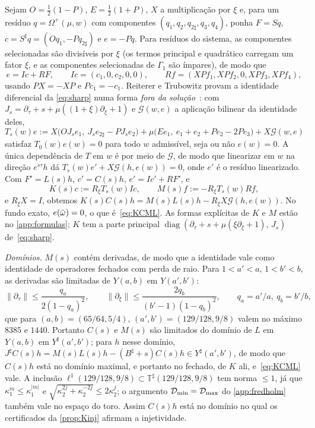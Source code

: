 Sejam $O=\tfrac12(1-P)$, $E=\tfrac12(1+P)$, $X$ a multiplicação por $\xi$ e, para um resíduo $q=\Omega^+(\mu,w)$ com
componentes $(q_1,q_2,q_{2\sharp},q_3,q_4)$, ponha $F=Sq$, $c=S^\sharp q=(Oq_1,-Pq_{2\sharp})$ e $e=-Pq$. Para resíduos
do sistema, as componentes selecionadas são divisíveis por $\xi$ (os termos principal e quadrático carregam um fator
$\xi$, e as componentes selecionadas de $\Gamma_1$ são ímpares), de modo que
\[
  e=Ic+RF,\qquad Ic=(c_1,0,c_2,0,0),\qquad Rf=(XPf_1,XPf_2,0,XPf_3,XPf_4),
\]
usando $PX=-XP$ e $Pc_1=-c_1$. Reiterer e Trubowitz provam a identidade diferencial da \cref{eq:sharp} numa forma
\emph{fora da solução}~\cite[\S2]{RT2019}: com $J_s=\partial_\tau+s+\mu((1+\xi)\partial_\xi+1)$ e $\mathcal G(w,e)$
a aplicação bilinear da identidade deles,
\[
  T_s(w)e:=X\big(OJ_se_1,\ J_se_{2\sharp}-PJ_se_2\big)+\mu\big(Ee_1,\ e_1+e_2+Pe_2-2Pe_3\big)+X\mathcal G(w,e)
\]
satisfaz $T_0(w)e(w)=0$ para todo $w$ admissível, seja ou não $e(w)=0$. A única dependência de $T$ em $w$ é
por meio de $\mathcal G$, de modo que linearizar em $w$ na direção $e^{s\tau}h$ dá $T_s(w)e'+X\mathcal G(h,e(w))=0$,
onde $e'$ é o resíduo linearizado. Com $F'=L(s)h$, $c'=C(s)h$, $e'=Ic'+RF'$, e
\[
  K(s)c:=R_\xi T_s(w)Ic,\qquad M(s)f:=-R_\xi T_s(w)Rf,
\]
e $R_\xi X=I$, obtemos $K(s)C(s)h=M(s)L(s)h-R_\xi X\mathcal G(h,e(w))$. No fundo exato, $e(\bar\omega)=0$,
o que é~\eqref{eq:KCML}. As formas explícitas de $K$ e $M$ estão no \cref{app:formulas}; $K$ tem a parte principal
$\operatorname{diag}(\partial_\tau+s+\mu(\xi\partial_\xi+1),\,J_s)$ de~\eqref{eq:sharp}.

\emph{Domínios.} $M(s)$ contém derivadas, de modo que a identidade vale como identidade de operadores fechados com perda de
raio. Para $1<a'<a$, $1<b'<b$, as derivadas são limitadas de $Y(a,b)$ em $Y(a',b')$:
\[
  \|\partial_\tau\|\le\frac{q_a}{2(1-q_a)^2},\qquad \|\partial_\xi\|\le\frac{2q_b}{(b'-1)(1-q_b)^2},\qquad
  q_a=a'/a,\ q_b=b'/b,
\]
que para $(a,b)=(65/64,5/4)$, $(a',b')=(129/128,9/8)$ valem no máximo $8385$ e $1440$. Portanto $C(s)$ e $M(s)$ são limitados
do domínio de $L$ em $Y(a,b)$ em $Y^\sharp(a',b')$; para $h$ nesse domínio,
$J^\sharp C(s)h=M(s)L(s)h-(B^\sharp+s)C(s)h\in Y^\sharp(a',b')$, de modo que $C(s)h$ está no domínio maximal, e portanto no fechado,
de $K$ ali, e~\eqref{eq:KCML} vale. A inclusão $\ell^1(129/128,9/8)\subset\mathbb T^\sharp(129/128,9/8)$ tem norma
$\le1$, já que $\kappa_1^m\le\kappa_1^{|m|}$ e $\sqrt{\kappa_2^{2j}+\kappa_2^{-2j}}\le2\kappa_2^j$; o argumento $\mathcal{D}_{\min}=\mathcal{D}_{\max}$
do \cref{app:fredholm} também vale no espaço do toro. Assim $C(s)h$ está no domínio no qual os certificados da
\cref{prop:Kinj} afirmam a injetividade.

